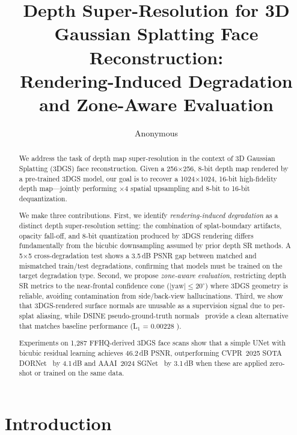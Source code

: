 \documentclass[10pt,twocolumn,letterpaper]{article}
\begin{document}
\title{Depth Super-Resolution for 3D Gaussian Splatting Face Reconstruction:\\Rendering-Induced Degradation and Zone-Aware Evaluation}

\author{Anonymous}

\maketitle

\begin{abstract}
We address the task of depth map super-resolution in the context of 3D Gaussian Splatting (3DGS) face reconstruction.
Given a 256$\times$256, 8-bit depth map rendered by a pre-trained 3DGS model, our goal is to recover a 1024$\times$1024, 16-bit high-fidelity depth map---jointly performing $\times$4 spatial upsampling and 8-bit to 16-bit dequantization.

We make three contributions.
First, we identify \emph{rendering-induced degradation} as a distinct depth super-resolution setting: the combination of splat-boundary artifacts, opacity fall-off, and 8-bit quantization produced by 3DGS rendering differs fundamentally from the bicubic downsampling assumed by prior depth SR methods.
A 5$\times$5 cross-degradation test shows a 3.5\,dB PSNR gap between matched and mismatched train/test degradations, confirming that models must be trained on the target degradation type.
Second, we propose \emph{zone-aware evaluation}, restricting depth SR metrics to the near-frontal confidence cone ($|\text{yaw}| \leq 20^\circ$) where 3DGS geometry is reliable, avoiding contamination from side/back-view hallucinations.
Third, we show that 3DGS-rendered surface normals are unusable as a supervision signal due to per-splat aliasing, while DSINE pseudo-ground-truth normals~\cite{bae2024dsine} provide a clean alternative that matches baseline performance (L$_1$ = 0.00228 ).

Experiments on 1{,}287 FFHQ-derived 3DGS face scans show that a simple UNet with bicubic residual learning achieves 46.2\,dB PSNR, outperforming CVPR~2025 SOTA DORNet~\cite{yan2025dornet} by 4.1\,dB and AAAI~2024 SGNet~\cite{yan2024sgnet} by 3.1\,dB when these are applied zero-shot or trained on the same data.
\end{abstract}

\section{Introduction}
\label{sec:intro}
\end{document}
